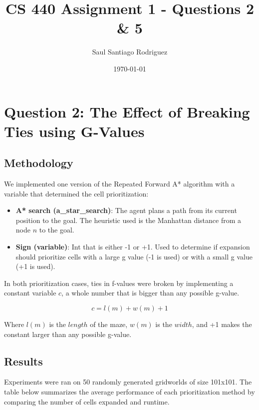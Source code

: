 \documentclass{article}
\title{CS 440 Assignment 1 - Questions 2 \& 5}
\author{Saul Santiago Rodriguez}
\date{\today}
\begin{document}
\maketitle

\section*{Question 2: The Effect of Breaking Ties using G-Values}

\subsection*{Methodology}
We implemented one version of the Repeated Forward A* algorithm with a variable that determined the cell prioritization:
\begin{itemize}
    \item \textbf{A* search (a\_star\_search)}: The agent plans a path from its current position to the goal. The heuristic used is the Manhattan distance from a node $n$ to the goal.  
    \item \textbf{Sign (variable)}: Int that is either -1 or +1. Used to determine if expansion should prioritize cells with a large g value (-1 is used) or with a small g value (+1 is used). 
\end{itemize}
In both prioritization cases, ties in f-values were broken by implementing a constant variable $c$, a whole number that is bigger than any possible g-value.

\[ c = l(m) + w(m) + 1 \]

\begin{center}
Where $l(m)$ is the $length$ of the maze, $w(m)$ is the $width$, and +1 makes the constant larger than any possible g-value.
\end{center} 

\subsection*{Results}
Experiments were ran on 50 randomly generated gridworlds of size 101x101. The table below summarizes the average performance of each prioritization method by comparing the number of cells expanded and runtime.
\end{document}
